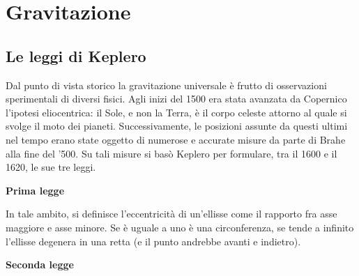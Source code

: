 \documentclass[10pt,a4paper]{book}
\begin{document}
\chapter{Gravitazione}

\section{Le leggi di Keplero}

Dal punto di vista storico la gravitazione universale è frutto di osservazioni sperimentali di diversi fisici. Agli inizi del 1500 era stata avanzata da Copernico l'ipotesi eliocentrica: il Sole, e non la Terra, è il corpo celeste attorno al quale si svolge il moto dei pianeti. Successivamente, le posizioni assunte da questi ultimi nel tempo erano state oggetto di numerose e accurate misure da parte di Brahe alla fine del '500. Su tali misure si basò Keplero per formulare, tra il 1600 e il 1620, le sue tre leggi.

\textbf{Prima legge}

\noindent{}

In tale ambito, si definisce l'eccentricità di un'ellisse come il rapporto fra asse maggiore e asse minore. Se è uguale a uno è una circonferenza, se tende a infinito l'ellisse degenera in una retta (e il punto andrebbe avanti e indietro).

\textbf{Seconda legge} 

\noindent{}
\end{document}
